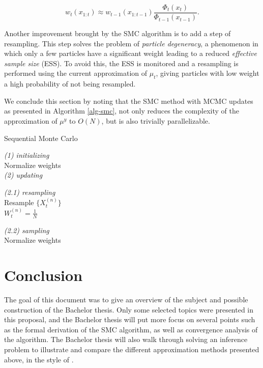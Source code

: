 \documentclass{article}
\begin{document}
\begin{equation}
  \label{weights-approx}
  w_t(x_{1:t}) \approx w_{t-1}(x_{1:t-1})\frac{\Phi_t(x_{t})}{\Phi_{t-1}(x_{t-1})}.
\end{equation}

Another improvement brought by the SMC algorithm is to add a step of resampling. This step solves the problem of \textit{particle degeneracy}, a phenomenon in which only a few particles have a significant weight leading to a reduced \textit{effective sample size} (ESS). To avoid this, the ESS is monitored and a resampling is performed using the current approximation of $\mu_t$, giving particles with low weight a high probability of not being resampled.

We conclude this section by noting that the SMC method with MCMC updates as presented in Algorithm \ref{alg-smc}, not only reduces the complexity of the approximation of $\mu^y$ to $O(N)$, but is also trivially parallelizable. 

\begin{algorithm}
  \label{alg-smc}
  \caption{Sequential Monte Carlo}
  \textit{(1) initializing}\\
  Normalize weights\\
 
  \textit{(2) updating}\\
   {
    \textit{(2.1) resampling}\\
     {
      Resample $\{X^{(n)}_t\}$\\
      $W^{(n)}_t = \frac{1}{N}$
    }

    \textit{(2.2) sampling}\\
    Normalize weights\\
  }
\end{algorithm}

\section{Conclusion}

The goal of this document was to give an overview of the subject and possible construction of the Bachelor thesis. Only some selected topics were presented in this proposal, and the Bachelor thesis will put more focus on several points such as the formal derivation of the SMC algorithm, as well as convergence analysis of the algorithm. The Bachelor thesis will also walk through solving an inference problem to illustrate and compare the different approximation methods presented above, in the style of \cite{bayes-tutorial}.



\end{document}
